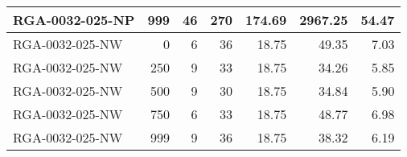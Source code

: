 \begin{table}[htbp]
{\begin{tabular}{lrrrrrr}
    RGA-0032-025-NP & 999    & 46     & 270    & 174.69 & 2967.25 & 54.47 \\ \hline
    RGA-0032-025-NW & 0      & 6      & 36     & 18.75  & 49.35  & 7.03 \\
    RGA-0032-025-NW & 250    & 9      & 33     & 18.75  & 34.26  & 5.85 \\
    RGA-0032-025-NW & 500    & 9      & 30     & 18.75  & 34.84  & 5.90 \\
    RGA-0032-025-NW & 750    & 6      & 33     & 18.75  & 48.77  & 6.98 \\
    RGA-0032-025-NW & 999    & 9      & 36     & 18.75  & 38.32  & 6.19 \\
    \bottomrule
    \end{tabular}}
  \label{tab:addlabel}%
\end{table}%
